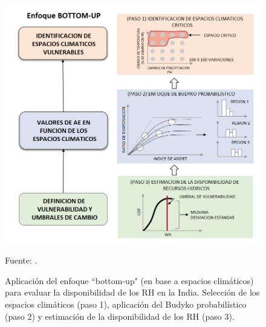 \begin{figure}[ht!]
	\includegraphics[scale=0.65]{Images/Singh2015.png}
	\centering
	\caption{Aplicación del enfoque “bottom-up" (en base a espacios climáticos) para evaluar la disponibilidad de los RH en la India. Selección de los espacios climáticos (paso 1), aplicación del Budyko probabilístico (paso 2) y estimación de la disponibilidad de los RH (paso 3).}
	Fuente: \citet{Singh2015}.
	\label{fig:Singh2015}
\end{figure}